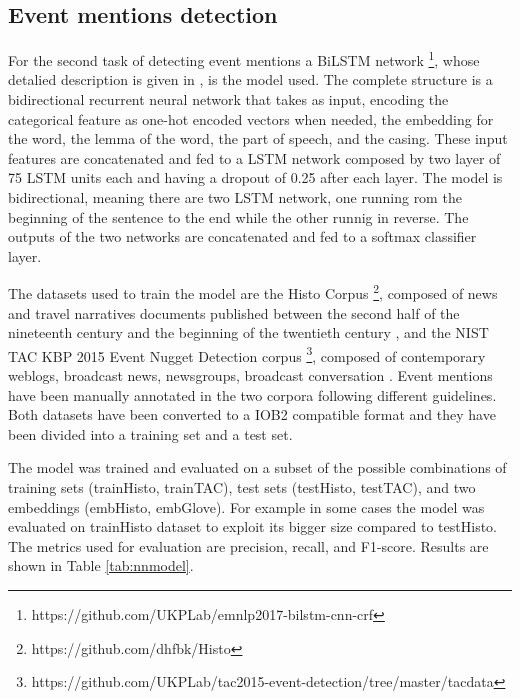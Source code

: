 \documentclass[runningheads]{llncs}
\begin{document}
\subsection{Event mentions detection}


For the second task of detecting event mentions a BiLSTM network \footnote{https://github.com/UKPLab/emnlp2017-bilstm-cnn-crf}, whose detalied description is given in \cite{bilstm}, is the model used. The complete structure is a bidirectional recurrent neural network that takes as input, encoding the categorical feature as one-hot encoded vectors when needed, the embedding for the word, the lemma of the word, the part of speech, and the casing. These input features are concatenated and fed to a LSTM network composed by two layer of 75 LSTM units each and having a dropout of 0.25 after each layer. The model is bidirectional, meaning there are two LSTM network, one running rom the beginning of the sentence to the end while the other runnig in reverse. The outputs of the two networks are concatenated and fed to a softmax classifier layer.

The datasets used to train the model are the Histo Corpus \footnote{https://github.com/dhfbk/Histo}, composed of news and travel narratives documents published between the second half of the nineteenth century and the beginning of the twentieth century \cite{histo}, and the NIST TAC KBP 2015 Event Nugget Detection corpus \footnote{https://github.com/UKPLab/tac2015-event-detection/tree/master/tacdata}, composed of contemporary weblogs, broadcast news, newsgroups, broadcast conversation \cite{tac}. Event mentions have been manually annotated in the two corpora following different guidelines. Both datasets have been converted to a IOB2 compatible format and they have been divided into a training set and a test set.

The model was trained and evaluated on a subset of the possible combinations of training sets (trainHisto, trainTAC), test sets (testHisto, testTAC), and two embeddings (embHisto, embGlove). For example in some cases the model was evaluated on trainHisto dataset to exploit its bigger size compared to testHisto. The metrics used for evaluation are precision, recall, and F1-score. Results are shown in Table \ref{tab:nnmodel}. 
\end{document}
